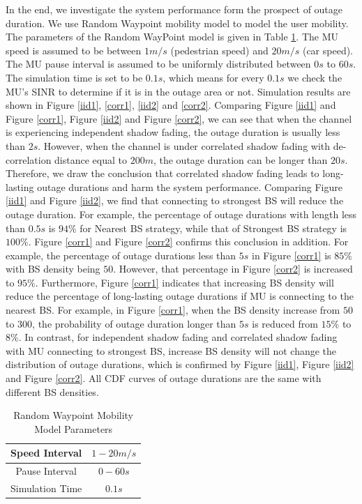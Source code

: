  \par In the end, we investigate the system performance form the prospect of outage duration. We use Random Waypoint mobility model to model the user mobility. The parameters of the Random WayPoint model is given in Table \ref{RWP}. The MU speed is assumed to be between $1m/s$ (pedestrian speed) and $20m/s$ (car speed). The MU pause interval is assumed to be uniformly distributed between $0s$ to $60s$. The simulation time is set to be $0.1s$, which means for every $0.1s$ we check the MU's SINR to determine if it is in the outage area or not. Simulation results are shown in Figure \ref{iid1}, \ref{corr1}, \ref{iid2} and \ref{corr2}. Comparing Figure \ref{iid1} and Figure \ref{corr1}, Figure \ref{iid2} and Figure \ref{corr2}, we can see that when the channel is experiencing independent shadow fading, the outage duration is usually less than $2s$. However,  when the channel is under correlated shadow fading with de-correlation distance equal to $200m$, the outage duration can be longer than $20s$. Therefore, we draw the conclusion that correlated shadow fading leads to long-lasting outage durations and harm the system performance. Comparing Figure \ref{iid1} and Figure \ref{iid2}, we find that connecting to strongest BS will reduce the outage duration. For example, the percentage of outage durations with length less than $0.5s$ is $94\%$ for Nearest BS strategy, while that  of Strongest BS strategy is $100\%$.  Figure \ref{corr1} and Figure \ref{corr2} confirms this conclusion in addition. For example, the percentage of outage durations less than $5s$ in Figure \ref{corr1} is $85\%$ with BS density being $50$. However, that percentage in Figure \ref{corr2} is increased to $95\%$. Furthermore, Figure \ref{corr1} indicates that increasing BS density will reduce the percentage of long-lasting outage durations if MU is connecting to the nearest BS. For example, in Figure \ref{corr1}, when the BS density increase from $50$ to $300$, the probability of outage duration longer than $5s$ is reduced from $15\%$ to $8\%$. In contrast, for independent shadow fading and correlated shadow fading with MU connecting to strongest BS, increase BS density will not change the distribution of outage durations, which is confirmed by Figure \ref{iid1}, Figure \ref{iid2} and Figure \ref{corr2}. All CDF curves of outage durations are the same with different BS densities. 
 \begin{table}
 \centering
 \caption{\label{RWP}Random Waypoint Mobility Model Parameters}

 \begin{tabular}{|c|c|}

 \hline
 Speed Interval & $1 - 20m/s$\\
 \hline
 Pause Interval & $0 - 60s$\\
 \hline
 Simulation Time & $0.1s$\\
 \hline
 \end{tabular}

 \end{table}

